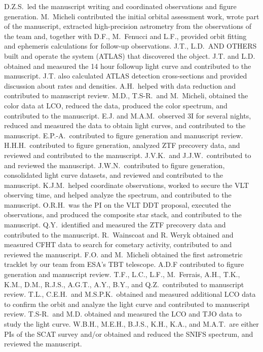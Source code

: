 \documentclass[twocolumn,longbib]{aastex7}
\begin{document}
\begin{CJK*}{UTF8}{gbsn}
\begin{contribution}
D.Z.S.\ led the manuscript writing and coordinated observations and figure generation.
M.\ Micheli contributed the initial orbital assessment work, wrote part of the manuscript, extracted high-precision astrometry from the observations of the team and, together with D.F., M.\ Fenucci and L.F., provided orbit fitting and ephemeris calculations for follow-up observations.
J.T., L.D.\ AND OTHERS built and operate the system (ATLAS) that discovered the object. J.T. and L.D. obtained and measured the 14 hour followup light curve and contributed to the manuscript.  J.T. also calculated ATLAS detection cross-sections and provided discussion about rates and densities.
A.H.\ helped with data reduction and contributed to manuscript review.
M.D., T.S-R.\, and M.\ Micheli,  obtained the color data at LCO, reduced the data, produced the color spectrum, and contributed to the manuscript.
E.J. and M.A.M.\ observed 3I for several nights, reduced and measured the data to obtain light curves, and contributed to the manuscript.
E.P.-A.\ contributed to figure generation and manuscript review.
H.H.H.\ contributed to figure generation, analyzed ZTF precovery data, and reviewed and contributed to the manuscript.
J.V.K.\ and J.J.W.\ contributed to and reviewed the manuscript.
J.W.N.\ contributed to figure generation, consolidated light curve datasets, and reviewed and contributed to the manuscript.
K.J.M.\ helped coordinate observations, worked to secure the VLT observing time, and helped analyze the spectrum, and contributed to the manuscript.
O.R.H.\ was the PI on the VLT DDT proposal, executed the observations, and produced the composite star stack, and contributed to the manuscript.
Q.Y.\ identified and measured the ZTF precovery data and contributed to the manuscript.
R.\ Wainscoat and R. Weryk obtained and measured CFHT data to search for cometary activity, contributed to and reviewed the manuscript.
F.O. and M.\ Micheli obtained the first astrometric tracklet by our team from ESA's TBT telescope.
A.D.F contributed to figure generation and manuscript review.
T.F., L.C., L.F., M.\ Ferrais, A.H., T.K., K.M., D.M., R.J.S., A.G.T., A.Y., B.Y., and Q.Z.\ contributed to manuscript review.
T.L., C.E.H.\ and M.S.P.K.\ obtained and measured additional LCO data to confirm the orbit and analyze the light curve and contributed to manuscript review.
T.S-R.\ and M.D. obtained and measured the LCO and TJO data to study the light curve.
W.B.H., M.E.H., B.J.S., K.H., K.A., and M.A.T.\ are either PIs of the SCAT survey and/or obtained and reduced the SNIFS spectrum, and reviewed the manuscript.


\end{contribution}


\software{}

{}



\end{CJK*}
\end{document}
